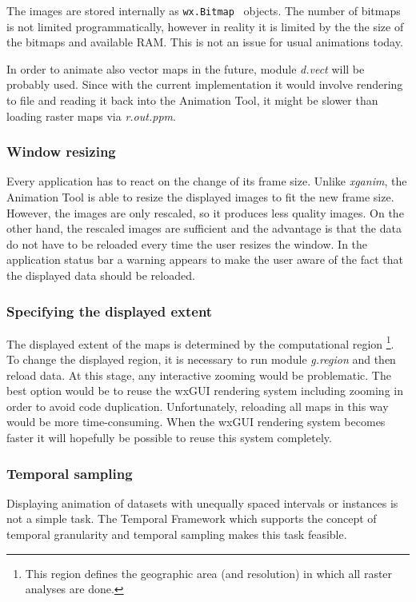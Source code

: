 \documentclass[a4paper,12pt,oneside]{book}
\newcommand{\module}[1]{\textsl{#1}}
\newcommand{\tf}{Temporal Framework\xspace}
\newcommand{\at}{Animation Tool\xspace}
\begin{document}
The images are stored internally as \verb|wx.Bitmap|~\cite{wxPythonDoc} objects.
The number of bitmaps is not limited programmatically,
however in reality it is limited by the the size of the bitmaps and available RAM.
This is not an issue for usual animations today.

In order to animate also vector maps in the future, module \module{d.vect} will be probably
used. Since with the current implementation it would involve rendering to file and reading it back
into the \at, it might be slower than loading raster maps via \module{r.out.ppm}.

\subsubsection{Window resizing}
Every application has to react on the change of its frame size.
Unlike \module{xganim}, the \at is able to resize the displayed images to fit the new frame size.
However, the images are only rescaled, so it produces less quality images.
On the other hand, the rescaled images are sufficient and the advantage is that
the data do not have to be reloaded every time the user resizes the window.
In the application status bar a warning appears to make the user aware of the fact
that the displayed data should be reloaded.

\subsubsection{Specifying the displayed extent}
The displayed extent of the maps is determined by the computational region%
\footnote{This region defines the geographic area (and resolution) in which all raster analyses are done.}.
To change the displayed region, it is necessary to run module \module{g.region} and then reload data.
At this stage, any interactive zooming would be problematic.
The best option would be to reuse the wxGUI rendering system including zooming in order to avoid code duplication.
Unfortunately, reloading all maps in this way would be more time-consuming.
When the wxGUI rendering system becomes faster
it will hopefully be  possible to reuse this system completely.


\subsubsection{Temporal sampling}
Displaying animation of datasets with unequally spaced intervals or instances is not a simple task.
The \tf which supports the concept of temporal granularity and temporal sampling makes this task feasible.
\end{document}
